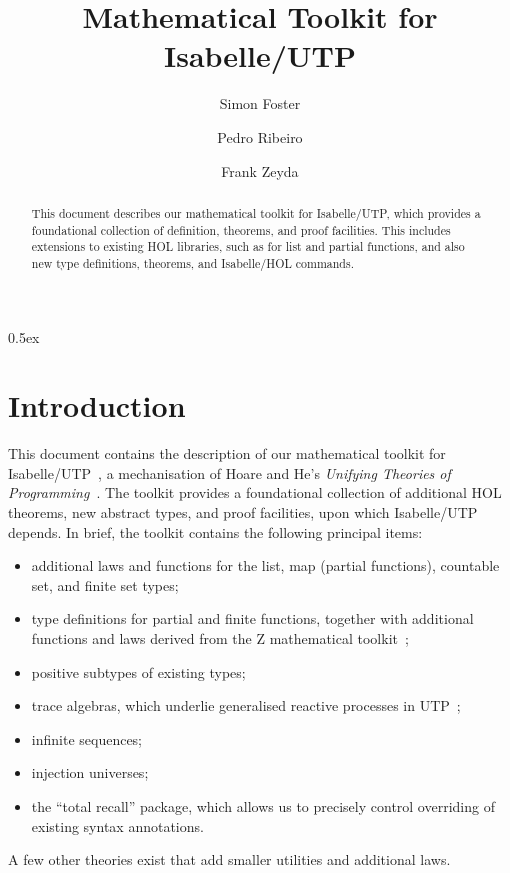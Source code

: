\documentclass[11pt,a4paper]{article}
\begin{document}
\title{Mathematical Toolkit for Isabelle/UTP}

\author{Simon Foster \and Pedro Ribeiro \and Frank Zeyda}

\maketitle

\begin{abstract}
This document describes our mathematical toolkit for Isabelle/UTP, which provides a foundational
collection of definition, theorems, and proof facilities. This includes extensions to existing
HOL libraries, such as for list and partial functions, and also new type definitions, theorems, and 
Isabelle/HOL commands.
\end{abstract}

\tableofcontents

\parindent 0pt\parskip 0.5ex

\section{Introduction}

This document contains the description of our mathematical toolkit for 
Isabelle/UTP~\cite{Feliachi2010,Foster14c,Foster16a,Foster16c}, a mechanisation of Hoare and He's 
\emph{Unifying Theories of Programming}~\cite{Hoare&98,Cavalcanti&06}. The toolkit provides a 
foundational collection of additional HOL theorems, new abstract types, and proof facilities, upon 
which Isabelle/UTP depends. In brief, the toolkit contains the following principal items:

\begin{itemize}
  \item additional laws and functions for the list, map (partial functions), countable set, and finite set types;
  \item type definitions for partial and finite functions, together with additional functions and laws
    derived from the Z mathematical toolkit~\cite{zrm};
  \item positive subtypes of existing types;
  \item trace algebras, which underlie generalised reactive processes in UTP~\cite{Foster17b};
  \item infinite sequences;
  \item injection universes;
  \item the ``total recall'' package, which allows us to precisely control overriding of existing syntax 
    annotations.
\end{itemize}

A few other theories exist that add smaller utilities and additional laws.





\end{document}
